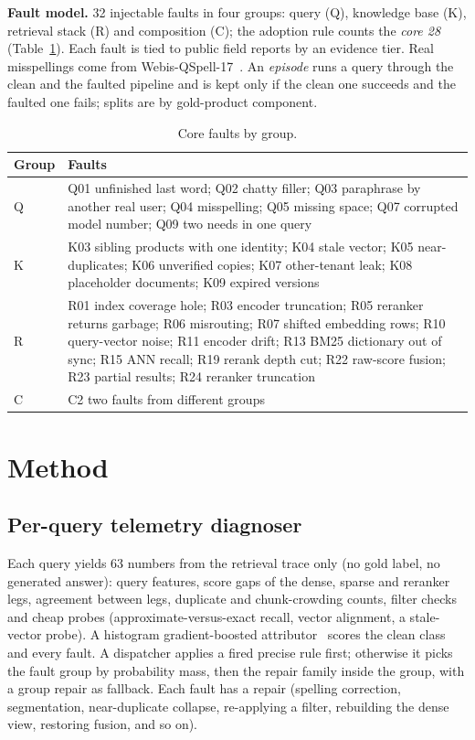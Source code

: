 \documentclass[conference]{IEEEtran}
\begin{document}
\textbf{Fault model.} 32 injectable faults in four groups: query (Q), knowledge base (K), retrieval stack (R) and composition (C); the adoption rule counts the \emph{core 28} (Table~\ref{tab:faults}). Each fault is tied to public field reports by an evidence tier. Real misspellings come from Webis-QSpell-17~\cite{hagen2017qspell}. An \emph{episode} runs a query through the clean and the faulted pipeline and is kept only if the clean one succeeds and the faulted one fails; splits are by gold-product component.

\begin{table}[t]
\caption{Core faults by group.}
\label{tab:faults}
\centering\footnotesize
\begin{tabular}{@{}p{}p{}@{}}
\toprule
Group & Faults\\
\midrule
Q & Q01 unfinished last word; Q02 chatty filler; Q03 paraphrase by another real user; Q04 misspelling; Q05 missing space; Q07 corrupted model number; Q09 two needs in one query\\
K & K03 sibling products with one identity; K04 stale vector; K05 near-duplicates; K06 unverified copies; K07 other-tenant leak; K08 placeholder documents; K09 expired versions\\
R & R01 index coverage hole; R03 encoder truncation; R05 reranker returns garbage; R06 misrouting; R07 shifted embedding rows; R10 query-vector noise; R11 encoder drift; R13 BM25 dictionary out of sync; R15 ANN recall; R19 rerank depth cut; R22 raw-score fusion; R23 partial results; R24 reranker truncation\\
C & C2 two faults from different groups\\
\bottomrule
\end{tabular}
\end{table}

\section{Method}\label{sec:method}
\subsection{Per-query telemetry diagnoser}
Each query yields 63 numbers from the retrieval trace only (no gold label, no generated answer): query features, score gaps of the dense, sparse and reranker legs, agreement between legs, duplicate and chunk-crowding counts, filter checks and cheap probes (approximate-versus-exact recall, vector alignment, a stale-vector probe). A histogram gradient-boosted attributor~\cite{pedregosa2011sklearn} scores the clean class and every fault. A dispatcher applies a fired precise rule first; otherwise it picks the fault group by probability mass, then the repair family inside the group, with a group repair as fallback. Each fault has a repair (spelling correction, segmentation, near-duplicate collapse, re-applying a filter, rebuilding the dense view, restoring fusion, and so on).
\end{document}
